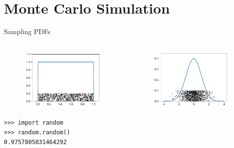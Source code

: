 \documentclass[12pt, aspectratio=149]{beamer}
\theoremstyle{plain}
\begin{document}
\section{Monte Carlo Simulation}


\begin{frame}[fragile]{Sampling PDFs}
	\begin{columns}
	\begin{column}{0.5\textwidth}
		\begin{center}
		 \begin{figure}
			 \centering
			 \includegraphics[width=0.99\linewidth]{figures/uniform_samples}
		 \end{figure}
		 \begin{verbatim}
>>> import random
>>> random.random()
0.9757805031464292
		 \end{verbatim}
		 \end{center}
	\end{column}
	\begin{column}{0.5\textwidth}  %
		\begin{center}
		 \begin{figure}
			 \centering
			 \includegraphics[width=0.99\linewidth]{figures/normal_samples}

\end{figure}
\end{center}
\end{column}
\end{columns}
\end{frame}
\end{document}
